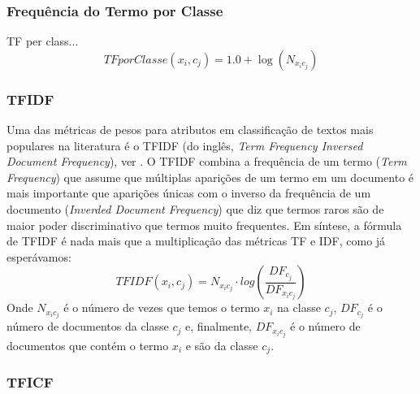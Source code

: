 \subsubsection{Frequência do Termo por Classe}
\label{subsubsection::tf}
TF per class...
\begin{equation}\label{eqn::tf}
   TFporClasse(x_i, c_j) = 1.0 + \log{ ( N_{x_ic_j} ) }
\end{equation}


\subsubsection{TFIDF}
\label{subsubsection::tfidf}

Uma das métricas de pesos para atributos em classificação de textos mais populares na literatura é o TFIDF (do inglês, \textit{Term Frequency Inversed Document Frequency}), ver \cite{Salton88}. O TFIDF combina a frequência de um termo (\textit{Term Frequency}) que assume que múltiplas aparições de um termo em um documento é mais importante que aparições únicas com o inverso da frequência de um documento (\textit{Inverded Document Frequency}) que diz que termos raros são de maior poder discriminativo que termos muito frequentes. Em síntese, a fórmula de TFIDF é nada mais que a multiplicação das métricas TF e IDF, como já esperávamos:
\begin{equation}\label{eqn::tficf}
   TFIDF(x_i, c_j) =  N_{x_ic_j} \cdot log( \frac{DF_{c_j}}{ DF_{x_ic_j} } )
\end{equation}
Onde $N_{x_ic_j}$ é o número de vezes que temos o termo $x_i$ na classe $c_j$, $DF_{c_j}$ é o número de documentos da classe $c_j$ e, finalmente, $DF_{x_ic_j}$ é o número de documentos que contém o termo $x_i$ e são da classe $c_j$.

\subsubsection{TFICF}
\label{subsubsection::tficf}

